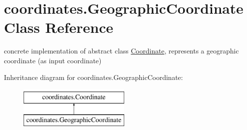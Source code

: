 \hypertarget{classcoordinates_1_1_geographic_coordinate}{}\section{coordinates.\+Geographic\+Coordinate Class Reference}
\label{classcoordinates_1_1_geographic_coordinate}


concrete implementation of abstract class \hyperlink{classcoordinates_1_1_coordinate}{Coordinate}, represents a geographic coordinate (as input coordinate)~\newline
  


Inheritance diagram for coordinates.\+Geographic\+Coordinate\+:\begin{figure}[H]
\begin{center}
\leavevmode
\includegraphics[height=2.000000cm]{classcoordinates_1_1_geographic_coordinate}
\end{center}
\end{figure}
